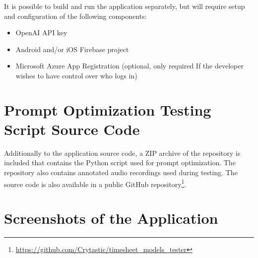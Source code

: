 \documentclass[
  digital,     %
  oneside,     %
  nosansbold,  %
  nocolorbold, %
  lof,         %
  lot,         %
]{fithesis4}
\begin{document}
It is possible to build and run the application separately, but will require setup and configuration of the following components:
\begin{itemize}
  \item OpenAI \gls{API} key
  \item Android and/or \gls{iOS} Firebase project
  \item Microsoft Azure App Registration (optional, only required If the developer wishes to have control over who logs in)
\end{itemize}

\chapter{Prompt Optimization Testing Script Source Code}
Additionally to the application source code, a ZIP archive of the repository is included that contains the Python script used for prompt optimization. The repository also contains annotated audio recordings used during testing. The source code is also available in a public GitHub repository\footnote{
\url{https://github.com/Crytastic/timesheet_models_tester}
}.

\chapter{Screenshots of the Application}
\end{document}
